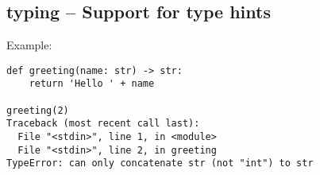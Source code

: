\subsection{typing -- Support for type hints}
Example:

\begin{verbatim}
def greeting(name: str) -> str:
    return 'Hello ' + name

greeting(2)
Traceback (most recent call last):
  File "<stdin>", line 1, in <module>
  File "<stdin>", line 2, in greeting
TypeError: can only concatenate str (not "int") to str
\end{verbatim}

%
